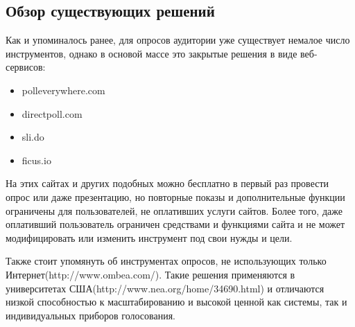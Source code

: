 \subsection{Обзор существующих решений}
Как и упоминалось ранее, для опросов аудитории уже существует немалое число инструментов, однако в основой массе это закрытые решения в виде веб-сервисов:
\begin{itemize}
	\item polleverywhere.com
	\item directpoll.com
	\item sli.do
	\item ficus.io
\end{itemize}
На этих сайтах и других подобных можно бесплатно в первый раз провести опрос или даже презентацию, но повторные показы и дополнительные функции ограничены для пользователей, не оплативших услуги сайтов. Более того, даже оплативший пользователь ограничен средствами и функциями сайта и не может модифицировать или изменить инструмент под свои нужды и цели.

Также стоит упомянуть об инструментах опросов, не использующих только Интернет(http://www.ombea.com/). Такие решения применяются в университетах США(http://www.nea.org/home/34690.html) и отличаются низкой способностью к масштабированию и высокой ценной как системы, так и индивидуальных приборов голосования.

